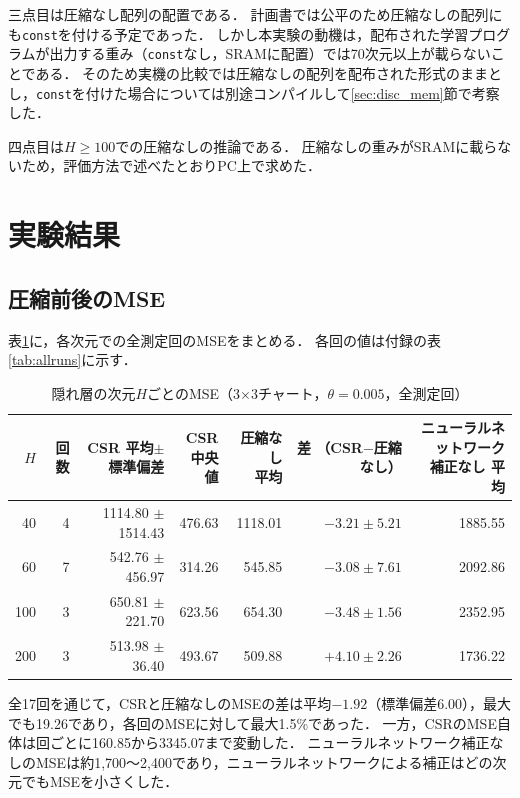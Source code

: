 \documentclass[a4paper,11pt,uplatex,dvipdfmx]{jsarticle}
\begin{document}
三点目は圧縮なし配列の配置である．
計画書では公平のため圧縮なしの配列にも\texttt{const}を付ける予定であった．
しかし本実験の動機は，配布された学習プログラムが出力する重み（\texttt{const}なし，SRAMに配置）では70次元以上が載らないことである．
そのため実機の比較では圧縮なしの配列を配布された形式のままとし，\texttt{const}を付けた場合については別途コンパイルして\ref{sec:disc_mem}節で考察した．

四点目は$H \geq 100$での圧縮なしの推論である．
圧縮なしの重みがSRAMに載らないため，評価方法で述べたとおりPC上で求めた．

\section{実験結果}
\subsection{圧縮前後のMSE}
表\ref{tab:mse}に，各次元での全測定回のMSEをまとめる．
各回の値は付録の表\ref{tab:allruns}に示す．

\begin{table}[H]
  \centering
  \caption{隠れ層の次元$H$ごとのMSE（3$\times$3チャート，$\theta=0.005$，全測定回）}
  \label{tab:mse}
  \small
  \begin{tabular}{rrrrrrr}
    \toprule
    $H$ & 回数 & \shortstack[r]{CSR\\平均$\pm$標準偏差} & \shortstack[r]{CSR\\中央値} & \shortstack[r]{圧縮なし\\平均} & \shortstack[r]{差\\（CSR$-$圧縮なし）} & \shortstack[r]{ニューラルネットワーク\\補正なし 平均} \\
    \midrule
    40  & 4 & 1114.80 $\pm$ 1514.43 & 476.63 & 1118.01 & $-3.21 \pm 5.21$ & 1885.55 \\
    60  & 7 &  542.76 $\pm$ 456.97  & 314.26 &  545.85 & $-3.08 \pm 7.61$ & 2092.86 \\
    100 & 3 &  650.81 $\pm$ 221.70  & 623.56 &  654.30 & $-3.48 \pm 1.56$ & 2352.95 \\
    200 & 3 &  513.98 $\pm$ 36.40   & 493.67 &  509.88 & $+4.10 \pm 2.26$ & 1736.22 \\
    \bottomrule
  \end{tabular}
\end{table}

全17回を通じて，CSRと圧縮なしのMSEの差は平均$-1.92$（標準偏差6.00），最大でも19.26であり，各回のMSEに対して最大1.5\%であった．
一方，CSRのMSE自体は回ごとに160.85から3345.07まで変動した．
ニューラルネットワーク補正なしのMSEは約1{,}700〜2{,}400であり，ニューラルネットワークによる補正はどの次元でもMSEを小さくした．
\end{document}
